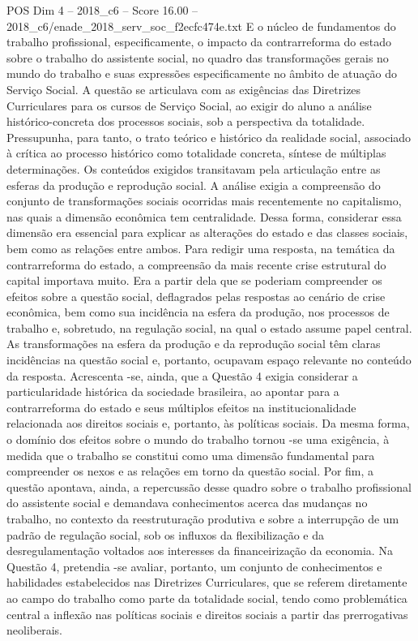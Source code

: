 \begin{textsample}{POS Dim 4 – 2018\_c6 – Score 16.00 – 2018\_c6/enade\_2018\_serv\_soc\_f2ecfc474e.txt}
E o núcleo de fundamentos do trabalho profissional, especificamente, o impacto da contrarreforma do estado sobre o trabalho do assistente social, no quadro das transformações gerais no mundo do trabalho e suas expressões especificamente no âmbito de atuação do Serviço Social.
A questão se articulava com as exigências das Diretrizes Curriculares para os cursos de Serviço Social, ao exigir do aluno a análise histórico-concreta dos processos sociais, sob a perspectiva da totalidade.
Pressupunha, para tanto, o trato teórico e histórico da realidade social, associado à crítica ao processo histórico como totalidade concreta, síntese de múltiplas determinações.
Os conteúdos exigidos transitavam pela articulação entre as esferas da produção e reprodução social.
A análise exigia a compreensão do conjunto de transformações sociais ocorridas mais recentemente no capitalismo, nas quais a dimensão econômica tem centralidade.
Dessa forma, considerar essa dimensão era essencial para explicar as alterações do estado e das classes sociais, bem como as relações entre ambos.
Para redigir uma resposta, na temática da contrarreforma do estado, a compreensão da mais recente crise estrutural do capital importava muito.
Era a partir dela que se poderiam compreender os efeitos sobre a questão social, deflagrados pelas respostas ao cenário de crise econômica, bem como sua incidência na esfera da produção, nos processos de trabalho e, sobretudo, na regulação social, na qual o estado assume papel central.
As transformações na esfera da produção e da reprodução social têm claras incidências na questão social e, portanto, ocupavam espaço relevante no conteúdo da resposta.
Acrescenta -se, ainda, que a Questão 4 exigia considerar a particularidade histórica da sociedade brasileira, ao apontar para a contrarreforma do estado e seus múltiplos efeitos na institucionalidade relacionada aos direitos sociais e, portanto, às políticas sociais.
Da mesma forma, o domínio dos efeitos sobre o mundo do trabalho tornou -se uma exigência, à medida que o trabalho se constitui como uma dimensão fundamental para compreender os nexos e as relações em torno da questão social.
Por fim, a questão apontava, ainda, a repercussão desse quadro sobre o trabalho profissional do assistente social e demandava conhecimentos acerca das mudanças no trabalho, no contexto da reestruturação produtiva e sobre a interrupção de um padrão de regulação social, sob os influxos da flexibilização e da desregulamentação voltados aos interesses da financeirização da economia.
Na Questão 4, pretendia -se avaliar, portanto, um conjunto de conhecimentos e habilidades estabelecidos nas Diretrizes Curriculares, que se referem diretamente ao campo do trabalho como parte da totalidade social, tendo como problemática central a inflexão nas políticas sociais e direitos sociais a partir das prerrogativas neoliberais.

\end{textsample}
